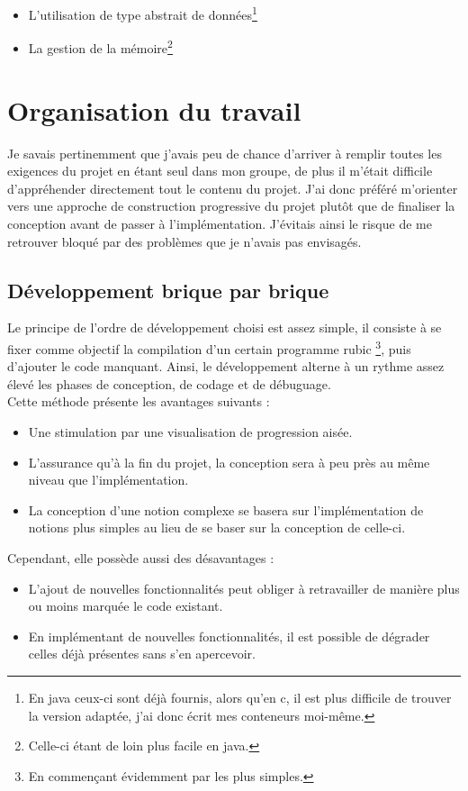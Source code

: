 \documentclass[12pt]{article}
\begin{document}
\begin{itemize}
\item L'utilisation de type abstrait de données\footnote{En java ceux-ci sont
déjà fournis, alors qu'en c, il est plus difficile de trouver la version
adaptée, j'ai donc écrit mes conteneurs moi-même.}
\item La gestion de la mémoire\footnote{Celle-ci étant de loin plus facile en
java.}
\end{itemize}

\section{Organisation du travail}

Je savais pertinemment que j'avais peu de chance d'arriver à remplir toutes les
exigences du projet en étant seul dans mon groupe, de plus il m'était difficile
d'appréhender directement tout le contenu du projet. J'ai donc préféré
m'orienter vers une approche de construction progressive du projet plutôt que de
finaliser la conception avant de passer à l'implémentation. J'évitais ainsi le
risque de me retrouver bloqué par des problèmes que je n'avais pas envisagés.

\subsection{Développement brique par brique}
Le principe de l'ordre de développement choisi est assez simple, il consiste
à se fixer comme objectif la compilation d'un certain programme rubic
\footnote{En commençant évidemment par les plus simples.}, puis d'ajouter le
code manquant. Ainsi, le développement alterne à un rythme assez élevé les
phases de conception, de codage et de débuguage.\\

Cette méthode présente les avantages suivants :
\begin{itemize}
\item Une stimulation par une visualisation de progression aisée.
\item L'assurance qu'à la fin du projet, la conception sera à peu près au
  même niveau que l'implémentation.
\item La conception d'une notion complexe se basera sur l'implémentation de
  notions plus simples au lieu de se baser sur la conception de celle-ci.
\end{itemize}

Cependant, elle possède aussi des désavantages :
\begin{itemize}
\item L'ajout de nouvelles fonctionnalités peut obliger à retravailler de
  manière plus ou moins marquée le code existant.
\item En implémentant de nouvelles fonctionnalités, il est possible de
  dégrader celles déjà présentes sans s'en apercevoir.
\end{itemize}
\end{document}

